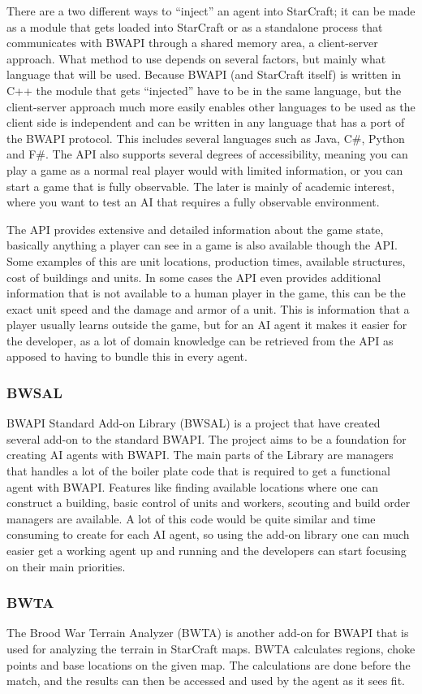 There are a two different ways to ``inject'' an agent into StarCraft; it can be
made as a module that gets loaded into StarCraft or as a standalone process that
communicates with BWAPI through a shared memory area, a client-server approach.
What method to use depends on several factors, but mainly what language that
will be used. Because BWAPI (and StarCraft itself) is written in C++ the module
that gets ``injected'' have to be in the same language, but the client-server
approach much more easily enables other languages to be used as the client side
is independent and can be written in any language that has a port of the BWAPI
protocol. This includes several languages such as Java, C\#, Python and F\#.
The API also supports several degrees of accessibility, meaning you can play a
game as a normal real player would with limited information, or you can start a
game that is fully observable. The later is mainly of academic interest, where
you want to test an AI that requires a fully observable environment.

The API provides extensive and detailed information about the game state,
basically anything a player can see in a game is also available though the API.
Some examples of this are unit locations, production times, available
structures, cost of buildings and units. In some cases the API even provides
additional information that is not available to a human player in the game, this
can be the exact unit speed and the damage and armor of a unit. This is
information that a player usually learns outside the game, but for an AI agent
it makes it easier for the developer, as a lot of domain knowledge can be
retrieved from the API as apposed to having to bundle this in every agent. 

\subsubsection{BWSAL}
BWAPI Standard Add-on Library (BWSAL)\cite{bwsal} is a project that have created
several add-on to the standard BWAPI. The project aims to be a foundation for
creating AI agents with BWAPI. The main parts of the Library are managers that
handles a lot of the boiler plate code that is required to get a functional
agent with BWAPI. Features like finding available locations where one can
construct a building, basic control of units and workers, scouting and build
order managers are available. A lot of this code would be quite similar and time
consuming to create for each AI agent, so using the add-on library one can much
easier get a working agent up and running and the developers can start focusing
on their main priorities. 

\subsubsection{BWTA}
The Brood War Terrain Analyzer (BWTA)\cite{bwta} is another add-on for BWAPI
that is used for analyzing the terrain in StarCraft maps. BWTA calculates
regions, choke points and base locations on the given map. The calculations are
done before the match, and the results can then be accessed and used by the
agent as it sees fit.  